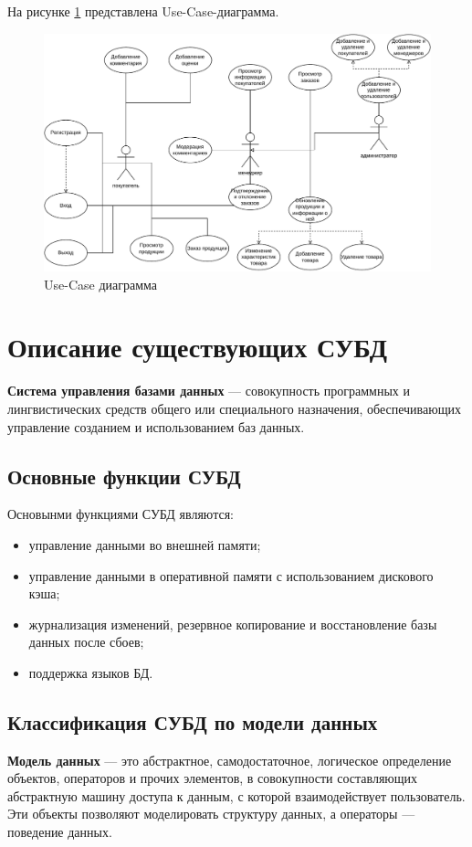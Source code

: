 \newpage

На рисунке \ref{use_case} представлена Use-Case-диаграмма.

\begin{figure}[h!]
	\begin{center}
		\includegraphics[scale=0.6]{assets/use_case.pdf}
	\end{center}
	\caption{Use-Case диаграмма}
	\label{use_case}
\end{figure}

\section{Описание существующих СУБД}
\textbf{Система управления базами данных} --- совокупность программных и лингвистических средств общего или специального назначения, обеспечивающих управление созданием и использованием баз данных.

\subsection{Основные функции СУБД}
Основынми функциями СУБД являются:
\begin{itemize}
	\item управление данными во внешней памяти;
	\item управление данными в оперативной памяти с использованием дискового кэша;
	\item журнализация изменений, резервное копирование и восстановление базы данных после сбоев;
	\item поддержка языков БД.
\end{itemize}

\subsection{Классификация СУБД по модели данных}
\textbf{Модель данных} --- это абстрактное, самодостаточное, логическое определение объектов, операторов и прочих элементов, в совокупности составляющих абстрактную машину доступа к данным, с которой взаимодействует пользователь. Эти объекты позволяют моделировать структуру данных, а операторы --- поведение данных. 


